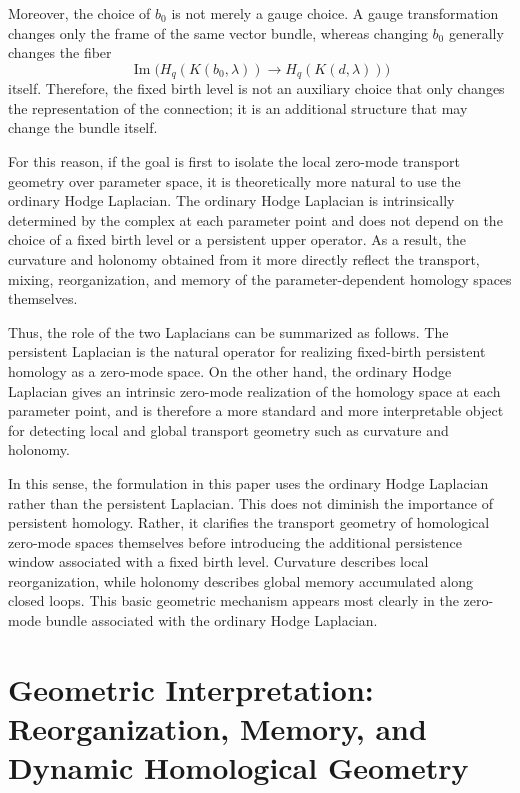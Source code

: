 \documentclass[pdflatex,sn-mathphys-num]{sn-jnl}%
\theoremstyle{thmstyleone}%
\theoremstyle{thmstyletwo}%
\theoremstyle{thmstylethree}%
\begin{document}
Moreover, the choice of \(b_0\) is not merely a gauge choice. A gauge transformation changes only the frame of the same vector bundle, whereas changing \(b_0\) generally changes the fiber
\[
\operatorname{Im}
\bigl(
H_q(K(b_0,\lambda))
\to
H_q(K(d,\lambda))
\bigr)
\]
itself. Therefore, the fixed birth level is not an auxiliary choice that only changes the representation of the connection; it is an additional structure that may change the bundle itself.

For this reason, if the goal is first to isolate the local zero-mode transport geometry over parameter space, it is theoretically more natural to use the ordinary Hodge Laplacian. The ordinary Hodge Laplacian is intrinsically determined by the complex at each parameter point and does not depend on the choice of a fixed birth level or a persistent upper operator. As a result, the curvature and holonomy obtained from it more directly reflect the transport, mixing, reorganization, and memory of the parameter-dependent homology spaces themselves.

Thus, the role of the two Laplacians can be summarized as follows. The persistent Laplacian is the natural operator for realizing fixed-birth persistent homology as a zero-mode space. On the other hand, the ordinary Hodge Laplacian gives an intrinsic zero-mode realization of the homology space at each parameter point, and is therefore a more standard and more interpretable object for detecting local and global transport geometry such as curvature and holonomy.

In this sense, the formulation in this paper uses the ordinary Hodge Laplacian rather than the persistent Laplacian. This does not diminish the importance of persistent homology. Rather, it clarifies the transport geometry of homological zero-mode spaces themselves before introducing the additional persistence window associated with a fixed birth level. Curvature describes local reorganization, while holonomy describes global memory accumulated along closed loops. This basic geometric mechanism appears most clearly in the zero-mode bundle associated with the ordinary Hodge Laplacian.






\section{Geometric Interpretation: Reorganization, Memory, and Dynamic Homological Geometry}
\end{document}
